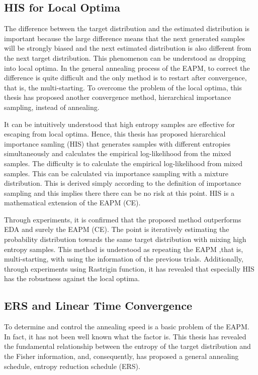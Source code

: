 \subsection{HIS for Local Optima}
The difference between the target distribution and
the estimated distribution is important
because the large difference means that 
the next generated samples will be strongly biased and 
the next estimated distribution is also different from 
the next target distribution.
This phenomenon can be understood as dropping into local optima.
In the general annealing process of the EAPM,
to correct the difference is quite difficult
and the only method is to restart after convergence,
that is, the multi-starting.
To overcome the problem of the local optima,
this thesis has proposed another convergence method, 
hierarchical importance sampling,
instead of annealing.

It can be intuitively understood that
high entropy samples are effective for escaping from local optima.
Hence, this thesis has proposed
hierarchical importance samling (HIS) 
that generates samples with different entropies simultaneously and
calculates the empirical log-likelihood from the mixed samples.
The difficulty is to calculate the empirical log-likelihood 
from mixed samples.
This can be calculated via importance sampling with a mixture 
distribution.
This is derived simply according to the definition of
importance sampling and this implies 
there there can be no risk at this point.
HIS is a mathematical extension of the EAPM (CE).

Through experiments, it is confirmed that 
the proposed method outperforms EDA and surely the EAPM (CE).
The point is iteratively estimating the probability distribution
towards the same target distribution with mixing high entropy samples.
This method is understood as repeating the EAPM ,that is, 
multi-starting,  with using the information of the previous trials.
Additionally, through experiments using Rastrigin function,
it has revealed that 
especially HIS has the robustness against the local optima.


\subsection{ERS and Linear Time Convergence}
To determine and control the annealing speed 
is a basic problem of the EAPM.
In fact, it has not been well known what the factor is. 
This thesis has revealed the fundamental relationship between
the entropy of the target distribution and the Fisher information,
and, consequently, 
has proposed a general annealing schedule, entropy reduction schedule (ERS).

